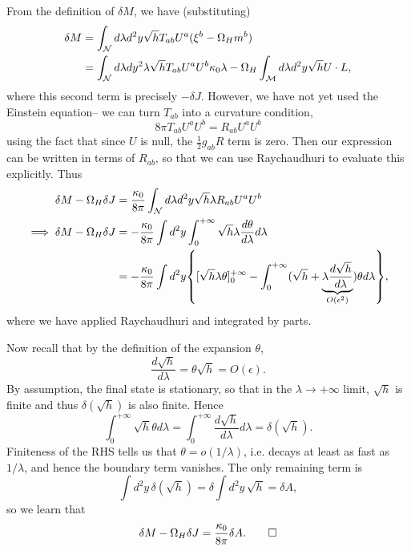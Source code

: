 From the definition of $\delta M$, we have (substituting)
\begin{align*}
    \delta M &= \int_\mathcal N d\lambda d^2y \sqrt{h} T_{ab} U^a(\xi^b -\Omega_H m^b)\\
        &= \int_\mathcal N d\lambda dy^2 \lambda \sqrt{h } T_{ab} U^a U^b \kappa_0 \lambda -\Omega_H \int_{\mathcal{M}} d\lambda d^2y \sqrt{h} U\cdot L,
\end{align*}
where this second term is precisely $-\delta J$. However, we have not yet used the Einstein equation-- we can turn $T_{ab}$ into a curvature condition,
\begin{equation}
    8\pi T_{ab} U^a U^b = R_{ab} U^a U^b
\end{equation}
using the fact that since $U$ is null, the $\frac{1}{2}g_{ab}R$ term is zero. Then our expression can be written in terms of $R_{ab}$, so that we can use Raychaudhuri to evaluate this explicitly. Thus
\begin{align*}
    \delta M -\Omega_H \delta J &= \frac{\kappa_0}{8\pi} \int_\cN d\lambda d^2 y \sqrt{h} \lambda R_{ab} U^a U^b\\
    \implies \delta M -\Omega_H \delta J &= -\frac{\kappa_0}{8\pi} \int d^2y \int_0^{+\infty} \sqrt{h} \lambda \frac{d\theta}{d\lambda} d\lambda\\
    &= -\frac{\kappa_0}{8\pi} \int d^2y \set*{ [\sqrt{h}\lambda\theta]_0^{+\infty} -\int_0^{+\infty}(\sqrt{h}+ \underbrace{\lambda \frac{d\sqrt{h}}{d\lambda}}_{O(\epsilon^2)})\theta d\lambda},
\end{align*}
where we have applied Raychaudhuri and integrated by parts.

Now recall that by the definition of the expansion $\theta$,
\begin{equation}
    \frac{d\sqrt{h}}{d\lambda}=\theta\sqrt{h}=O(\epsilon).
\end{equation}
By assumption, the final state is stationary, so that in the $\lambda\to +\infty$ limit, $\sqrt{h}$ is finite and thus $\delta(\sqrt{h})$ is also finite. Hence
\begin{equation}
    \int_0^{+\infty} \sqrt{h}\theta d\lambda = \int_0^{+\infty} \frac{d\sqrt{h}}{d\lambda} d\lambda = \delta(\sqrt{h}).
\end{equation}
Finiteness of the RHS tells us that $\theta = o(1/\lambda)$, i.e. decays at least as fast as $1/\lambda$, and hence the boundary term vanishes. The only remaining term is
\begin{equation}
    \int d^2y \,\delta(\sqrt{h}) = \delta \int d^2y \, \sqrt{h} = \delta A,
\end{equation}
so we learn that
\begin{equation}
    \delta M-\Omega_H \delta J = \frac{\kappa_0}{8\pi} \delta A. \qed
\end{equation}